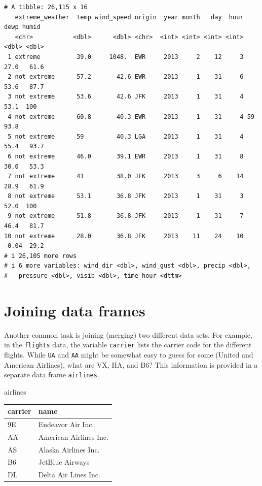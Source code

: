 \documentclass[
  letterpaper,
  DIV=11,
  numbers=noendperiod]{scrartcl}
\newenvironment{Shaded}{\begin{snugshade}}{\end{snugshade}}
\newcommand{\NormalTok}[1]{\textcolor[rgb]{0.00,0.23,0.31}{#1}}
\begin{document}
\begin{tcolorbox}
\begin{verbatim}
# A tibble: 26,115 x 16
   extreme_weather  temp wind_speed origin  year month   day  hour  dewp humid
   <chr>           <dbl>      <dbl> <chr>  <int> <int> <int> <int> <dbl> <dbl>
 1 extreme          39.0     1048.  EWR     2013     2    12     3 27.0   61.6
 2 not extreme      57.2       42.6 EWR     2013     1    31     6 53.6   87.7
 3 not extreme      53.6       42.6 JFK     2013     1    31     4 53.1  100  
 4 not extreme      60.8       40.3 EWR     2013     1    31     4 59     93.8
 5 not extreme      59         40.3 LGA     2013     1    31     4 55.4   93.7
 6 not extreme      46.0       39.1 EWR     2013     1    31     8 30.0   53.3
 7 not extreme      41         38.0 JFK     2013     3     6    14 28.9   61.9
 8 not extreme      53.1       36.8 JFK     2013     1    31     3 52.0  100  
 9 not extreme      51.8       36.8 JFK     2013     1    31     7 46.4   81.7
10 not extreme      28.0       36.8 JFK     2013    11    24    10 -0.04  29.2
# i 26,105 more rows
# i 6 more variables: wind_dir <dbl>, wind_gust <dbl>, precip <dbl>,
#   pressure <dbl>, visib <dbl>, time_hour <dttm>
\end{verbatim}

\end{tcolorbox}

\section{Joining data frames}\label{joins}

Another common task is joining (merging) two different data sets. For
example, in the \texttt{flights} data, the variable \texttt{carrier}
lists the carrier code for the different flights. While \texttt{UA} and
\texttt{AA} might be somewhat easy to guess for some (United and
American Airlines), what are VX, HA, and B6? This information is
provided in a separate data frame \texttt{airlines}.

\begin{Shaded}
\begin{Highlighting}[]
\NormalTok{airlines}
\end{Highlighting}
\end{Shaded}

\begin{longtable}[]{@{}ll@{}}
\toprule\noalign{}
carrier & name \\
\midrule\noalign{}
\endhead
\bottomrule\noalign{}
\endlastfoot
9E & Endeavor Air Inc. \\
AA & American Airlines Inc. \\
AS & Alaska Airlines Inc. \\
B6 & JetBlue Airways \\
DL & Delta Air Lines Inc. \\
\end{longtable}
\end{document}
